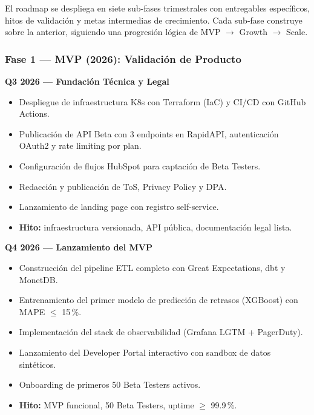 ﻿\documentclass[11pt, letterpaper]{article}
\begin{document}
El roadmap se despliega en siete sub-fases trimestrales con entregables específicos, hitos de validación y metas intermedias de crecimiento. Cada sub-fase construye sobre la anterior, siguiendo una progresión lógica de MVP $\rightarrow$ Growth $\rightarrow$ Scale.



\subsubsection{Fase 1 --- MVP (2026): Validación de Producto}



\textbf{Q3 2026 --- Fundación Técnica y Legal}

\begin{itemize}[leftmargin=1.5cm, label=\textbullet, itemsep=2pt, topsep=4pt]

    \item Despliegue de infraestructura K8s con Terraform (IaC) y CI/CD con GitHub Actions.

    \item Publicación de API Beta con 3 endpoints en RapidAPI, autenticación OAuth2 y rate limiting por plan.

    \item Configuración de flujos HubSpot para captación de Beta Testers.

    \item Redacción y publicación de ToS, Privacy Policy y DPA.

    \item Lanzamiento de landing page con registro self-service.

    \item \textbf{Hito:} infraestructura versionada, API pública, documentación legal lista.

\end{itemize}



\textbf{Q4 2026 --- Lanzamiento del MVP}

\begin{itemize}[leftmargin=1.5cm, label=\textbullet, itemsep=2pt, topsep=4pt]

    \item Construcción del pipeline ETL completo con Great Expectations, dbt y MonetDB.

    \item Entrenamiento del primer modelo de predicción de retrasos (XGBoost) con MAPE $\le$ 15\,\%.

    \item Implementación del stack de observabilidad (Grafana LGTM + PagerDuty).

    \item Lanzamiento del Developer Portal interactivo con sandbox de datos sintéticos.

    \item Onboarding de primeros 50 Beta Testers activos.

    \item \textbf{Hito:} MVP funcional, 50 Beta Testers, uptime $\ge$ 99.9\,\%.

\end{itemize}
\end{document}
